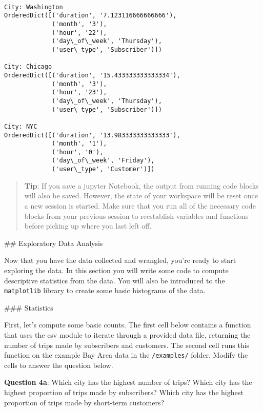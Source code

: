 \documentclass[11pt]{article}
\begin{document}
    \begin{Verbatim}[commandchars=\\\{\}]

City: Washington
OrderedDict([('duration', '7.123116666666666'),
             ('month', '3'),
             ('hour', '22'),
             ('day\_of\_week', 'Thursday'),
             ('user\_type', 'Subscriber')])

City: Chicago
OrderedDict([('duration', '15.433333333333334'),
             ('month', '3'),
             ('hour', '23'),
             ('day\_of\_week', 'Thursday'),
             ('user\_type', 'Subscriber')])

City: NYC
OrderedDict([('duration', '13.983333333333333'),
             ('month', '1'),
             ('hour', '0'),
             ('day\_of\_week', 'Friday'),
             ('user\_type', 'Customer')])

    \end{Verbatim}

    \begin{quote}
\textbf{Tip}: If you save a jupyter Notebook, the output from running
code blocks will also be saved. However, the state of your workspace
will be reset once a new session is started. Make sure that you run all
of the necessary code blocks from your previous session to reestablish
variables and functions before picking up where you last left off.
\end{quote}

 \#\# Exploratory Data Analysis

Now that you have the data collected and wrangled, you're ready to start
exploring the data. In this section you will write some code to compute
descriptive statistics from the data. You will also be introduced to the
\texttt{matplotlib} library to create some basic histograms of the data.

 \#\#\# Statistics

First, let's compute some basic counts. The first cell below contains a
function that uses the csv module to iterate through a provided data
file, returning the number of trips made by subscribers and customers.
The second cell runs this function on the example Bay Area data in the
\texttt{/examples/} folder. Modify the cells to answer the question
below.

\textbf{Question 4a}: Which city has the highest number of trips? Which
city has the highest proportion of trips made by subscribers? Which city
has the highest proportion of trips made by short-term customers?
\end{document}
